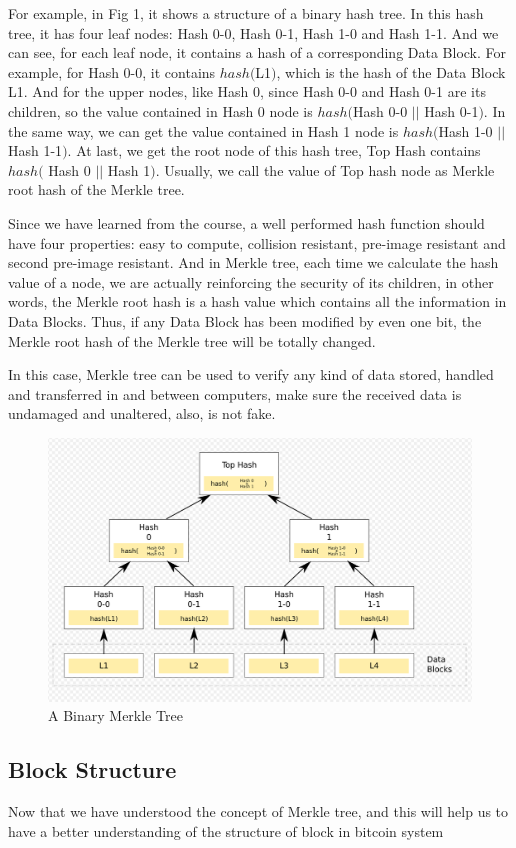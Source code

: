 \documentclass[12pt,a4paper]{article}
\begin{document}
For example, in Fig 1, it shows a structure of a binary hash tree. In this hash tree, it has four leaf nodes: Hash 0-0, Hash 0-1, Hash 1-0 and Hash 1-1. And we can see, for each leaf node, it contains a hash of a corresponding Data Block. For example, for Hash 0-0, it contains $hash($L1$)$, which is the hash of the Data Block L1. And for the upper nodes, like Hash 0, since Hash 0-0 and Hash 0-1 are its children, so the value contained in Hash 0 node is $hash($Hash 0-0 $||$ Hash 0-1$)$. In the same way, we can get the value contained in Hash 1 node is $hash($Hash 1-0 $||$ Hash 1-1$)$. At last, we get the root node of this hash tree, Top Hash contains $hash($ Hash 0 $||$ Hash 1$)$. Usually, we call the value of Top hash node as Merkle root hash of the Merkle tree.

Since we have learned from the course, a well performed hash function should have four properties: easy to compute, collision resistant, pre-image resistant and second pre-image resistant. And in Merkle tree, each time we calculate the hash value of a node, we are actually reinforcing the security of its children, in other words, the Merkle root hash is a hash value which contains all the information in Data Blocks. Thus, if any Data Block has been modified by even one bit, the Merkle root hash of the Merkle tree will be totally changed.

In this case, Merkle tree can be used to verify any kind of data stored, handled and transferred in and between computers, make sure the received data is undamaged and unaltered, also, is not fake.

\begin{figure}[htbp!]
	\centering
	\includegraphics[width=0.7\linewidth]{hash_tree.png}
	\caption{A Binary Merkle Tree}
	\label{fig::diagram}
\end{figure}

\subsection{Block Structure}
Now that we have understood the concept of Merkle tree, and this will help us to have a better understanding of the structure of block in bitcoin system
\end{document}
